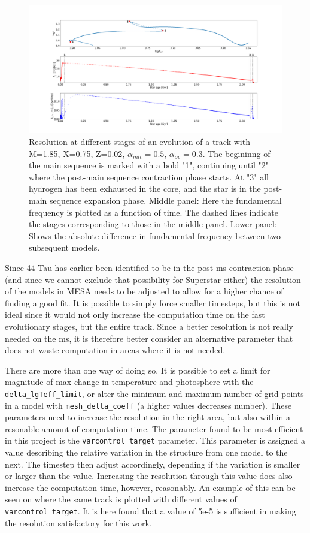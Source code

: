 \begin{figure}[htbp]
    \centering
    \includegraphics[width=1\textwidth]{resolution_stages.png}
    \caption{Resolution at different stages of an evolution of a track with M=1.85\msun, X=0.75, Z=0.02, $\alpha_{mlt} = 0.5$, $\alpha_{ov} = 0.3$. The begininng of the main sequence is marked with a bold "1", continuing until "2" where the post-main sequence contraction phase starts. At "3" all hydrogen has been exhausted in the core, and the star is in the post-main sequence expansion phase. Middle panel: Here the fundamental frequency is plotted as a function of time. The dashed lines indicate the stages corresponding to those in the middle panel. Lower panel: Shows the absolute difference in fundamental frequency between two subsequent models.}
    \label{resstage}
\end{figure}

Since 44 Tau has earlier been identified to be in the post-ms contraction phase (and since we cannot exclude that possibility for Superstar either) the resolution of the models in MESA needs to be adjusted to allow for a higher chance of finding a good fit. It is possible to simply force smaller timesteps, but this is not ideal since it would not only increase the computation time on the fast evolutionary stages, but the entire track. Since a better resolution is not really needed on the ms, it is therefore better consider an alternative parameter that does not waste computation in areas where it is not needed. 

There are more than one way of doing so. It is possible to set a limit for magnitude of max change in temperature and photosphere with the \texttt{delta\_lgTeff\_limit}, or alter the minimum and maximum number of grid points in a model with \texttt{mesh\_delta\_coeff} (a higher values decreases number). These parameters need to increase the resolution in the right area, but also within a resonable amount of computation time. The parameter found to be most efficient in this project is the \texttt{varcontrol\_target} parameter. This parameter is assigned a value describing the relative variation in the structure from one model to the next. The timestep then adjust accordingly, depending if the variation is smaller or larger than the value. Increasing the resolution through this value does also increase the computation time, however, reasonably. An example of this can be seen on  where the same track is plotted with different values of \texttt{varcontrol\_target}. It is here found that a value of 5e-5 is sufficient in making the resolution satisfactory for this work. 

